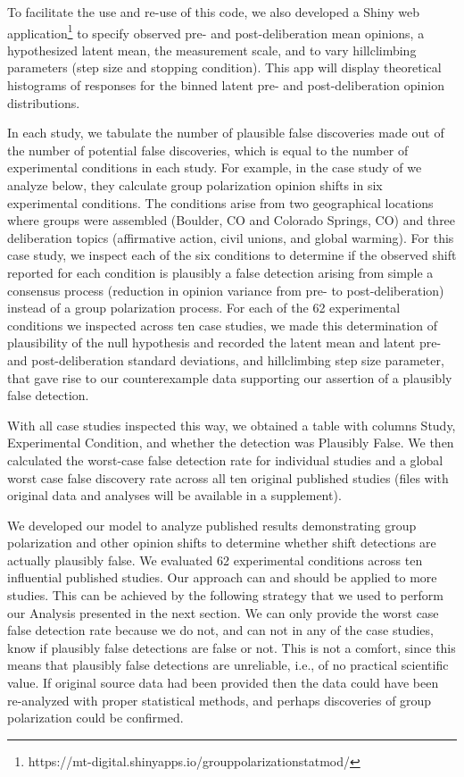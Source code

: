 To facilitate the use and re-use of this code, we also developed
a Shiny web application\footnote{https://mt-digital.shinyapps.io/grouppolarizationstatmod/} 
to specify observed pre- and post-deliberation
mean opinions, a hypothesized latent mean, the measurement scale, and
to vary hillclimbing parameters (step size and stopping condition). This
app will display theoretical histograms of responses for the binned
latent pre- and post-deliberation opinion distributions.  

In each study, we tabulate the number of plausible false discoveries made out
of the number of potential false discoveries, which is equal to the number of
experimental conditions in each study. 
For example, in the case study of  
we analyze below, they calculate group polarization opinion shifts in
six experimental conditions. The conditions arise from two 
geographical locations where groups were assembled (Boulder, CO and Colorado
Springs, CO) and three deliberation topics (affirmative action, 
civil unions, and global warming). For this case study,
we inspect each of the six conditions to determine if the observed shift
reported for each condition is plausibly a false detection arising from 
simple a consensus process (reduction in opinion variance from pre- to 
post-deliberation) instead of a group polarization process. For each
of the 62 experimental conditions we inspected across ten case studies,
we made this determination of plausibility of the null hypothesis and recorded
the latent mean and latent pre- and post-deliberation standard deviations,
and hillclimbing step size parameter,
that gave rise to our counterexample data supporting our assertion of a 
plausibly false detection. 

With all case studies inspected this way,
we obtained a table with columns Study, Experimental Condition, and
whether the detection was Plausibly False. We then calculated the worst-case
false detection rate for individual studies and a global worst case
false discovery rate across all ten original published studies (files with
original data and analyses will be available in a supplement). 

We developed our model to analyze published results demonstrating 
group polarization and other opinion shifts to determine whether shift
detections are actually plausibly false. We evaluated 62 experimental
conditions across ten influential published studies. Our approach can and should be
applied to more studies. This can be achieved by the following 
strategy that we used to perform our Analysis presented in the next section.
We can only provide the worst case false detection rate because we do not, 
and can not in any of the case studies, 
know if plausibly false detections are false or not. This is not a comfort,
since this means that plausibly false detections are unreliable, i.e.,
of no practical scientific value. If original source data had been provided
then the data could have been re-analyzed with proper statistical methods,
and perhaps discoveries of group polarization could be confirmed.

